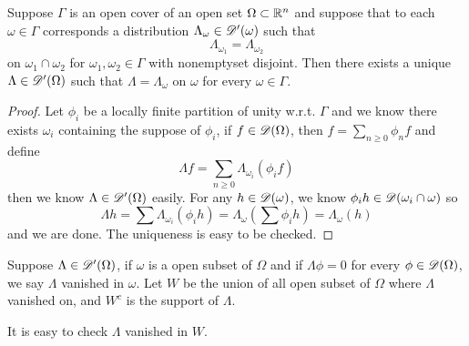 \begin{theorem}
    Suppose $\Gamma$ is an open cover of an open set $\Omega \subset \mathbb{R}^n$ and suppose that to each $\omega \in \Gamma$ corresponds a distribution $\Lambda_{\omega} \in \mathscr{D}'(\omega)$ such that
    \[
    \Lambda_{\omega_1} = \Lambda_{\omega_2}
    \]
    on $\omega_1\cap\omega_2$ for $\omega_1,\omega_2\in \Gamma$ with nonemptyset disjoint. Then there exists a unique $\Lambda \in \mathscr{D}'(\Omega)$ such that $\Lambda = \Lambda_{\omega}$ on $\omega$ for every $\omega \in \Gamma$.
\end{theorem}
\begin{proof}
    Let $\phi_i$ be a locally finite partition of unity w.r.t. $\Gamma$ and we know there exists $\omega_i$ containing the suppose of $\phi_i$, if $f \in \mathscr{D}(\Omega)$, then $f = \sum\limits_{n\geq 0}\phi_n f$ and define
    \[
    \Lambda f = \sum_{n\geq 0}\Lambda_{\omega_i}(\phi_i f)
    \]
    then we know $\Lambda \in \mathscr{D}'(\Omega)$ easily. For any $h \in \mathscr{D}(\omega)$, we know $\phi_ih\in\mathscr{D}(\omega_i\cap \omega)$ so
    \[
    \Lambda h = \sum\Lambda_{\omega_i}(\phi_ih) = \Lambda_{\omega}(\sum \phi_i h) = \Lambda_{\omega}(h)
    \]
    and we are done. The uniqueness is easy to be checked.
\end{proof}

\begin{definition}
    Suppose $\Lambda \in \mathscr{D}'(\Omega)$, if $\omega$ is a open subset of $\Omega$ and if $\Lambda \phi = 0$ for every $\phi \in \mathscr{D}(\Omega)$, we say $\Lambda$ vanished in $\omega$. Let $W$ be the union of all open subset of $\Omega$ where $\Lambda$ vanished on, and $W^c$ is the support of $\Lambda$.\par
    It is easy to check $\Lambda$ vanished in $W$.
\end{definition}

